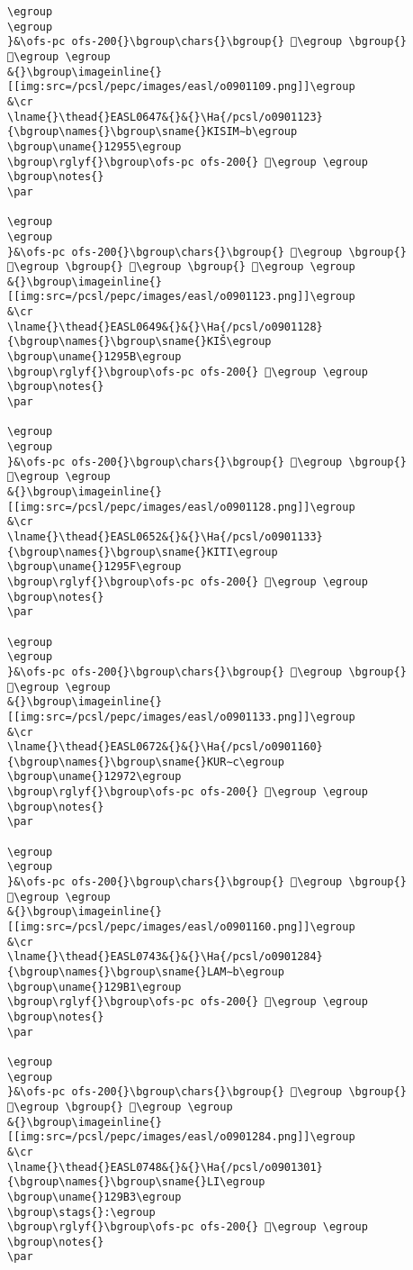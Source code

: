 \begin{verbatim}
\egroup
\egroup
}&\ofs-pc ofs-200{}\bgroup\chars{}\bgroup{} 𒥋\egroup \bgroup{} 𒥌\egroup \egroup
&{}\bgroup\imageinline{}[[img:src=/pcsl/pepc/images/easl/o0901109.png]]\egroup
&\cr
\lname{}\thead{}EASL0647&{}&{}\Ha{/pcsl/o0901123}{\bgroup\names{}\bgroup\sname{}KISIM∼b\egroup
\bgroup\uname{}12955\egroup
\bgroup\rglyf{}\bgroup\ofs-pc ofs-200{} 𒥕\egroup \egroup
\bgroup\notes{}
\par 

\egroup
\egroup
}&\ofs-pc ofs-200{}\bgroup\chars{}\bgroup{} 𒥕\egroup \bgroup{} 𒥖\egroup \bgroup{} 𒥗\egroup \bgroup{} 𒥘\egroup \egroup
&{}\bgroup\imageinline{}[[img:src=/pcsl/pepc/images/easl/o0901123.png]]\egroup
&\cr
\lname{}\thead{}EASL0649&{}&{}\Ha{/pcsl/o0901128}{\bgroup\names{}\bgroup\sname{}KIŠ\egroup
\bgroup\uname{}1295B\egroup
\bgroup\rglyf{}\bgroup\ofs-pc ofs-200{} 𒥛\egroup \egroup
\bgroup\notes{}
\par 

\egroup
\egroup
}&\ofs-pc ofs-200{}\bgroup\chars{}\bgroup{} 𒥚\egroup \bgroup{} 𒥛\egroup \egroup
&{}\bgroup\imageinline{}[[img:src=/pcsl/pepc/images/easl/o0901128.png]]\egroup
&\cr
\lname{}\thead{}EASL0652&{}&{}\Ha{/pcsl/o0901133}{\bgroup\names{}\bgroup\sname{}KITI\egroup
\bgroup\uname{}1295F\egroup
\bgroup\rglyf{}\bgroup\ofs-pc ofs-200{} 𒥟\egroup \egroup
\bgroup\notes{}
\par 

\egroup
\egroup
}&\ofs-pc ofs-200{}\bgroup\chars{}\bgroup{} 𒥞\egroup \bgroup{} 𒥟\egroup \egroup
&{}\bgroup\imageinline{}[[img:src=/pcsl/pepc/images/easl/o0901133.png]]\egroup
&\cr
\lname{}\thead{}EASL0672&{}&{}\Ha{/pcsl/o0901160}{\bgroup\names{}\bgroup\sname{}KUR∼c\egroup
\bgroup\uname{}12972\egroup
\bgroup\rglyf{}\bgroup\ofs-pc ofs-200{} 𒥲\egroup \egroup
\bgroup\notes{}
\par 

\egroup
\egroup
}&\ofs-pc ofs-200{}\bgroup\chars{}\bgroup{} 𒥱\egroup \bgroup{} 𒥲\egroup \egroup
&{}\bgroup\imageinline{}[[img:src=/pcsl/pepc/images/easl/o0901160.png]]\egroup
&\cr
\lname{}\thead{}EASL0743&{}&{}\Ha{/pcsl/o0901284}{\bgroup\names{}\bgroup\sname{}LAM∼b\egroup
\bgroup\uname{}129B1\egroup
\bgroup\rglyf{}\bgroup\ofs-pc ofs-200{} 𒦱\egroup \egroup
\bgroup\notes{}
\par 

\egroup
\egroup
}&\ofs-pc ofs-200{}\bgroup\chars{}\bgroup{} 𒦭\egroup \bgroup{} 𒦱\egroup \bgroup{} 𒦲\egroup \egroup
&{}\bgroup\imageinline{}[[img:src=/pcsl/pepc/images/easl/o0901284.png]]\egroup
&\cr
\lname{}\thead{}EASL0748&{}&{}\Ha{/pcsl/o0901301}{\bgroup\names{}\bgroup\sname{}LI\egroup
\bgroup\uname{}129B3\egroup
\bgroup\stags{}:\egroup
\bgroup\rglyf{}\bgroup\ofs-pc ofs-200{} 𒦳\egroup \egroup
\bgroup\notes{}
\par 


\end{verbatim}
